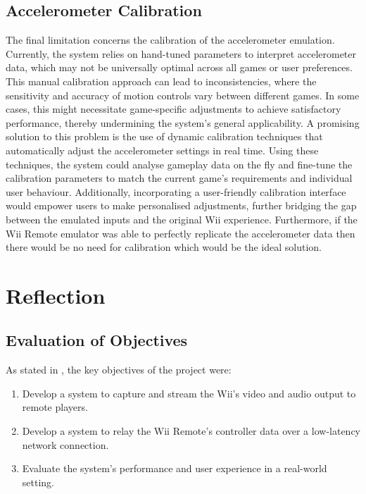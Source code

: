 \subsection{Accelerometer Calibration}

The final limitation concerns the calibration of the accelerometer emulation.
Currently, the system relies on hand-tuned parameters to interpret accelerometer
data, which may not be universally optimal across all games or user preferences.
This manual calibration approach can lead to inconsistencies, where the
sensitivity and accuracy of motion controls vary between different games. In
some cases, this might necessitate game-specific adjustments to achieve
satisfactory performance, thereby undermining the system’s general
applicability. A promising solution to this problem is the use of dynamic
calibration techniques that automatically adjust the accelerometer settings in
real time. Using these techniques, the system could analyse gameplay data on the
fly and fine-tune the calibration parameters to match the current game’s
requirements and individual user behaviour. Additionally, incorporating a
user-friendly calibration interface would empower users to make personalised
adjustments, further bridging the gap between the emulated inputs and the
original Wii experience. Furthermore, if the Wii Remote emulator was able to
perfectly replicate the accelerometer data then there would be no need for
calibration which would be the ideal solution.

\section{Reflection}

\subsection{Evaluation of Objectives}
As stated in , the key objectives of the project were:

\begin{enumerate}
	\item  Develop a system to capture and stream the Wii’s video and audio output to remote players.
	\item Develop a system to relay the Wii Remote’s controller data over a low-latency network connection.
	\item Evaluate the system’s performance and user experience in a real-world setting.
\end{enumerate}

